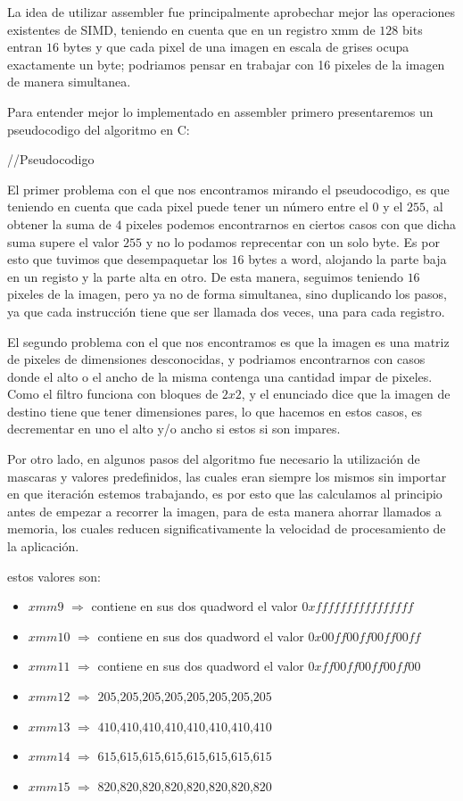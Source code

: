 La idea de utilizar assembler fue principalmente aprobechar mejor las operaciones existentes de SIMD, teniendo en cuenta que en un registro xmm de $128$ bits entran $16$ bytes y que cada pixel de una imagen en escala de grises ocupa exactamente un byte; podriamos pensar en trabajar con 16 pixeles de la imagen de manera simultanea. 

Para entender mejor lo implementado en assembler primero presentaremos un pseudocodigo del algoritmo en C:

//Pseudocodigo

El primer problema con el que nos encontramos mirando el pseudocodigo, es que teniendo en cuenta que cada pixel puede tener un número entre el $0$ y el $255$, al obtener la suma de $4$ pixeles podemos encontrarnos en ciertos casos con que dicha suma supere el valor $255$ y no lo podamos reprecentar con un solo byte. Es por esto que tuvimos que desempaquetar los $16$ bytes a word, alojando la parte baja en un registo y la parte alta en otro. De esta manera, seguimos teniendo $16$ pixeles de la imagen, pero ya no de forma simultanea, sino duplicando los pasos, ya que cada instrucción tiene que ser llamada dos veces, una para cada registro.

El segundo problema con el que nos encontramos es que la imagen es una matriz de pixeles de dimensiones desconocidas, y podriamos encontrarnos con casos donde el alto o el ancho de la misma contenga una cantidad impar de pixeles. Como el filtro funciona con bloques de $2x2$, y el enunciado dice que la imagen de destino tiene que tener dimensiones pares, lo que hacemos en estos casos, es decrementar en uno el alto y/o ancho si estos si son impares.

Por otro lado, en algunos pasos del algoritmo fue necesario la utilización de mascaras y valores predefinidos, las cuales eran siempre los mismos sin importar en que iteración estemos trabajando, es por esto que las calculamos al principio antes de empezar a recorrer la imagen, para de esta manera ahorrar llamados a memoria, los cuales reducen significativamente la velocidad de procesamiento de la aplicación.

estos valores son:
\begin{itemize}
  	\item $xmm9$ $\Rightarrow$ contiene en sus dos quadword el valor $0xffffffffffffffff$
	\item $xmm10$ $\Rightarrow$ contiene en sus dos quadword el valor $0x00ff00ff00ff00ff$
	\item $xmm11$ $\Rightarrow$ contiene en sus dos quadword el valor $0xff00ff00ff00ff00$
	\item $xmm12$ $\Rightarrow$ $205$,$205$,$205$,$205$,$205$,$205$,$205$,$205$
	\item $xmm13$ $\Rightarrow$ $410$,$410$,$410$,$410$,$410$,$410$,$410$,$410$
	\item $xmm14$ $\Rightarrow$ $615$,$615$,$615$,$615$,$615$,$615$,$615$,$615$
	\item $xmm15$ $\Rightarrow$ $820$,$820$,$820$,$820$,$820$,$820$,$820$,$820$ 
\end{itemize}

